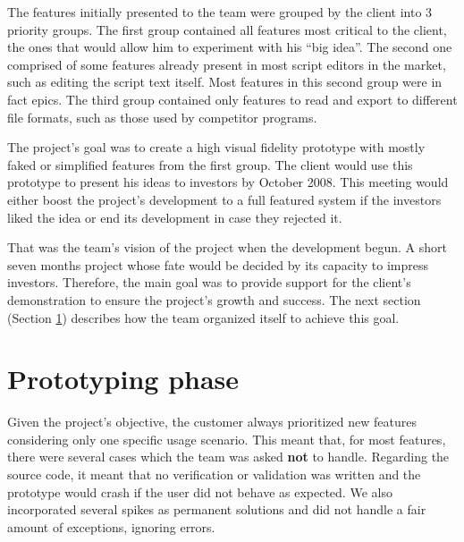 \documentclass[lnbip]{svmultln}
\begin{document}

The features initially presented to the team were grouped by the
client into 3 priority groups. The first group contained all features
most critical to the client, the ones that would allow him to
experiment with his ``big idea''. The second one comprised of some
features already present in most script editors in the market, such as
editing the script text itself. Most features in this second group
were in fact epics. The third group contained only features to read
and export to different file formats, such as those used by competitor
programs.

The project's goal was to create a high visual fidelity prototype with
mostly faked or simplified features from the first group. The client
would use this prototype to present his ideas to investors by October
2008. This meeting would either boost the project's development to a
full featured system if the investors liked the idea or end its
development in case they rejected it.

That was the team's vision of the project when the development
begun. A short seven months project whose fate would be decided by its
capacity to impress investors. Therefore, the main goal was to provide
support for the client's demonstration to ensure the project's growth
and success. The next section (Section \ref{sec:working}) describes
how the team organized itself to achieve this goal.

\section{Prototyping phase}
\label{sec:working}

Given the project's objective, the customer always prioritized new
features considering only one specific usage scenario. This meant
that, for most features, there were several cases which the team was
asked \textbf{not} to handle. Regarding the source code, it meant
that no verification or validation was written and the prototype would
crash if the user did not behave as expected. We also incorporated
several spikes as permanent solutions and did not handle a fair amount
of exceptions, ignoring errors.
\end{document}
